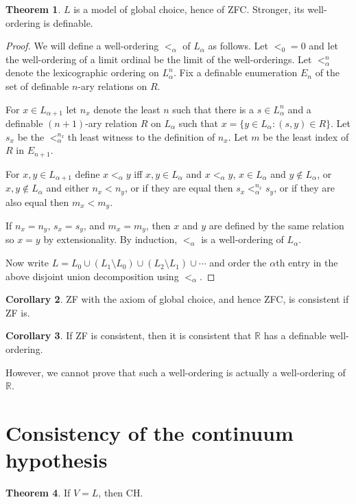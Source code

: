 \documentclass[12pt]{report}
\newcommand{\RR}{\mathbb{R}}
\theoremstyle{definition}
\newtheorem{theorem}{Theorem}[chapter]
\newtheorem{corollary}[theorem]{Corollary}
\begin{document}
\begin{theorem}
$L$ is a model of global choice, hence of ZFC. Stronger, its well-ordering is definable.
\end{theorem}
\begin{proof}
We will define a well-ordering $<_\alpha$ of $L_\alpha$ as follows. Let $<_0 = 0$ and let the well-ordering of a limit ordinal be the limit of the well-orderings. Let $<_\alpha^n$ denote the lexicographic ordering on $L_\alpha^n$. Fix a definable enumeration $E_n$ of the set of definable $n$-ary relations on $R$.

For $x \in L_{\alpha + 1}$ let $n_x$ denote the least $n$ such that there is a $s \in L_\alpha^n$ and a definable $(n+1)$-ary relation $R$ on $L_\alpha$ such that $x = \{y \in L_\alpha: (s, y) \in R\}$. Let $s_x$ be the $<_\alpha^{n_x}$th least witness to the definition of $n_x$. Let $m$ be the least index of $R$ in $E_{n+1}$.

For $x, y \in L_{\alpha + 1}$ define $x <_\alpha y$ iff $x, y \in L_\alpha$ and $x <_\alpha y$, $x \in L_\alpha$ and $y \notin L_\alpha$, or $x, y \notin L_\alpha$ and either $n_x < n_y$, or if they are equal then $s_x <_\alpha^{n_x} s_y$, or if they are also equal then $m_x < m_y$.

If $n_x = n_y$, $s_x = s_y$, and $m_x = m_y$, then $x$ and $y$ are defined by the same relation so $x = y$ by extensionality. By induction, $<_\alpha$ is a well-ordering of $L_\alpha$.

Now write $L = L_0 \cup (L_1 \setminus L_0) \cup (L_2 \setminus L_1) \cup \cdots$ and order the $\alpha$th entry in the above disjoint union decomposition using $<_\alpha$.
\end{proof}

\begin{corollary}
ZF with the axiom of global choice, and hence ZFC, is consistent if ZF is.
\end{corollary}

\begin{corollary}
If ZF is consistent, then it is consistent that $\RR$ has a definable well-ordering.
\end{corollary}
However, we cannot prove that such a well-ordering is actually a well-ordering of $\RR$.

\section{Consistency of the continuum hypothesis}
\begin{theorem}
    If $V = L$, then CH.
\end{theorem}
\end{document}
